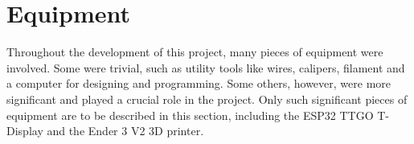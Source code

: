 \section{Equipment}

Throughout the development of this project, many pieces of equipment were involved. Some were trivial, such as utility tools like wires, calipers, filament and a computer for designing and programming. Some others, however, were more significant and played a crucial role in the project. Only such significant pieces of equipment are to be described in this section, including the ESP32 TTGO T-Display and the Ender 3 V2 3D printer.


